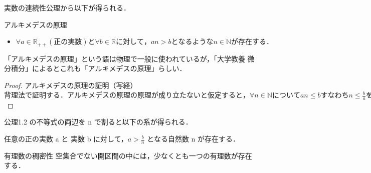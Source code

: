 \documentclass[a4paper, platex,dvipdfmx]{jlreq}			%
\begin{document}
実数の連続性公理から以下が得られる．
\begin{corollary}{アルキメデスの原理}{}
\begin{itemize}
\item $ \forall a \in \mathbb{R} _ {++} (正の実数) と \forall b \in \mathbb{R} に対して，an > b となるような n \in \mathbb{N} が存在する．$

\end{itemize}
\end{corollary}
「アルキメデスの原理」という語は物理で一般に使われているが，「大学教養 微分積分」によるとこれも「アルキメデスの原理」らしい．

\begin{proof}{アルキメデスの原理の証明（写経）}{}
\begin{math}
背理法で証明する．アルキメデスの原理の原理が成り立たないと仮定すると，\forall n \in \mathbb{N} について an \leq bすなわち n \leq \frac{b}{a} を満たす a \in \mathbb{R}_{++} と b \in \mathbb{R} が存在する．よって実数の連続性公理から \mathbb{N} は上に有界であり，\sup \mathbb{N} が存在する．また，\sup \mathbb{N} - 1 は \mathbb{N} の上界ではないので，\sup \mathbb{N} - 1 < m となる自然数 m が存在する．このとき，\sup \mathbb{N} < m + 1 であるから，\sup \mathbb{N} より大きい自然数 m + 1 が存在する．このことは，\forall n \in \mathbb{N} について n \leq \sup \mathbb{N} であることに矛盾する．
\end{math}
\end{proof}


公理1.2 の不等式の両辺を n で割ると以下の系が得られる．

\begin{corollary}{}{}
任意の正の実数 a と 実数 b に対して，$a > \frac{b}{n}$ となる自然数 n が存在する．
\end{corollary}

\begin{theorem}{有理数の稠密性}{}
空集合でない開区間の中には，少なくとも一つの有理数が存在する．
\end{theorem}
\end{document}
